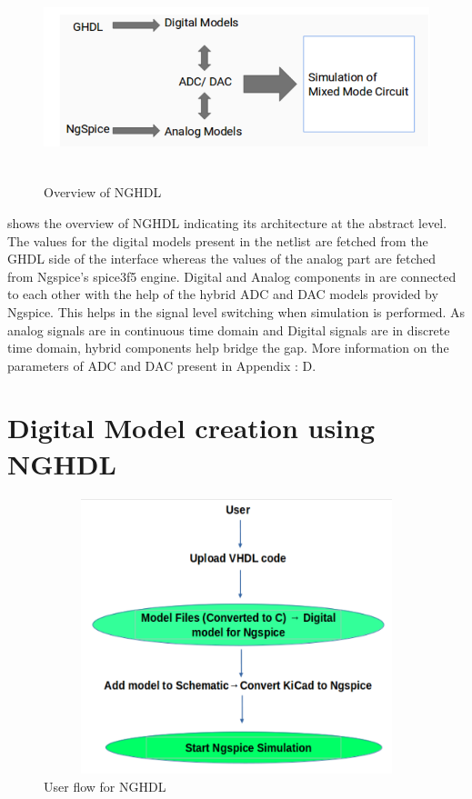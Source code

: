 \begin{figure}[!htp]
\centering
\includegraphics[width = 12cm, height = 6cm]{./NGHDL/NGHDL_Overview.png}
\caption{Overview of NGHDL}
\label{overview}
\end{figure}
 shows the overview of NGHDL indicating its architecture at the abstract level. The values for the digital models present in the netlist are fetched from the GHDL side of the interface whereas the values of the analog part are fetched from Ngspice's spice3f5 engine. Digital and Analog components in  are connected to each other with the help of the hybrid ADC and DAC models provided by Ngspice. This helps in the signal level switching when simulation is performed. As analog signals are in continuous time domain and Digital signals are in discrete time domain, hybrid components help bridge the gap. More information on the parameters of ADC and DAC present in Appendix : D.

\pagebreak

\section{Digital Model creation using NGHDL}


\begin{figure}[!htp]
\centering
\includegraphics[width = 12cm, height = 8cm]{./NGHDL/NGHDL_Flow.png}
\caption{User flow for NGHDL}
\label{user_flow}
\end{figure}

